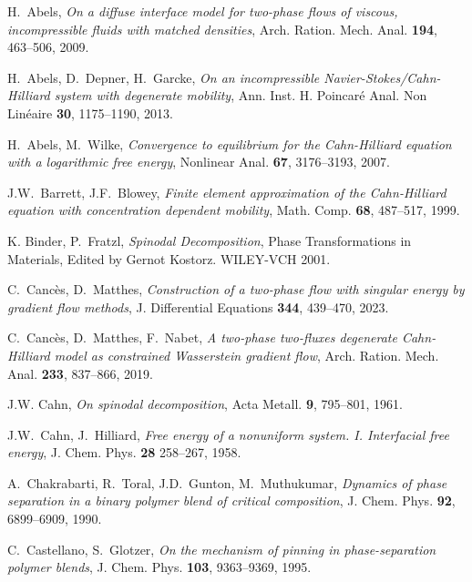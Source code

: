 \documentclass[11pt,  reqno]{amsart}%
\theoremstyle{plain}
\theoremstyle{definition}
\theoremstyle{remark}
\numberwithin{equation}{section}
\begin{document}
\begin{thebibliography}{}

H.~Abels,
\textit{On a diffuse interface model for two-phase flows of viscous, incompressible fluids with matched densities}, 
Arch. Ration. Mech. Anal. \textbf{194}, 463--506, 2009.

H.~Abels, D.~Depner, H.~Garcke,
\textit{On an incompressible {N}avier-{S}tokes/{C}ahn-{H}illiard system with degenerate mobility},
 Ann. Inst. H. Poincar\'{e} Anal. Non Lin\'{e}aire \textbf{30}, 1175--1190, 2013.

H.~Abels, M.~Wilke,
    \textit{Convergence to equilibrium for the {C}ahn-{H}illiard equation with a logarithmic free energy}, Nonlinear Anal. \textbf{67}, 3176--3193, 2007.

J.W.~Barrett, J.F.~Blowey,
 \textit{Finite element approximation of the {C}ahn-{H}illiard equation with concentration dependent mobility}, Math. Comp. \textbf{68}, 487--517, 1999.

K. Binder, P.~Fratzl, 
\textit{Spinodal Decomposition},
Phase Transformations in Materials,  Edited by Gernot Kostorz. WILEY-VCH 2001.

    C.~Canc{\`e}s, D.~Matthes,
    \textit{Construction of a two-phase flow with singular energy by gradient flow methods}, J. Differential Equations \textbf{344}, 439--470, 2023.

    C.~Canc{\`e}s, D.~Matthes, F.~Nabet,
    \textit{A two-phase two-fluxes degenerate {C}ahn-{H}illiard model as constrained {W}asserstein gradient flow}, Arch. Ration. Mech. Anal. \textbf{233}, 837--866, 2019.

J.W. Cahn, 
\textit{On spinodal decomposition}, 
Acta Metall. \textbf{9}, 795--801, 1961.

J.W.~Cahn, J.~Hilliard, 
\textit{Free energy of a nonuniform system. I. Interfacial free energy}, 
J. Chem. Phys. \textbf{28} 258--267, 1958.


A.~Chakrabarti, R.~Toral, J.D.~Gunton, M.~Muthukumar,
\textit{Dynamics of phase separation in a binary polymer blend of critical composition},
J. Chem. Phys. \textbf{92}, 6899--6909, 1990.

C.~Castellano, S.~Glotzer,
\textit{On the mechanism of pinning in phase-separation polymer blends},
J. Chem. Phys. \textbf{103}, 9363--9369, 1995.


\end{thebibliography}
\end{document}
